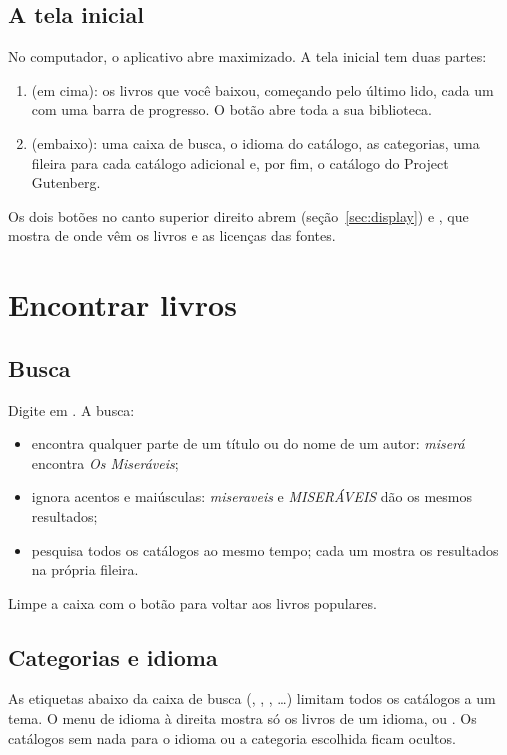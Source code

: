 \documentclass[11pt]{article}
\begin{document}
\subsection{A tela inicial}
No computador, o aplicativo abre maximizado. A tela inicial tem duas partes:

\begin{enumerate}
  \item {} (em cima): os livros que você baixou, começando pelo último lido, cada
        um com uma barra de progresso. O botão  abre toda a sua
        biblioteca.
  \item {} (embaixo): uma caixa de busca, o idioma do catálogo, as
        categorias, uma fileira para cada catálogo adicional e, por fim, o catálogo do Project
        Gutenberg.
\end{enumerate}


Os dois botões no canto superior direito abrem 
(seção~\ref{sec:display}) e , que mostra de onde vêm os livros e as licenças das fontes.

\section{Encontrar livros}

\subsection{Busca}
Digite em . A busca:
\begin{itemize}
  \item encontra qualquer parte de um título ou do nome de um autor: \emph{miserá} encontra
        \emph{Os Miseráveis};
  \item ignora acentos e maiúsculas: \emph{miseraveis} e \emph{MISERÁVEIS} dão os mesmos
        resultados;
  \item pesquisa todos os catálogos ao mesmo tempo; cada um mostra os resultados na própria
        fileira.
\end{itemize}
Limpe a caixa com o botão  para voltar aos livros populares.

\subsection{Categorias e idioma}
As etiquetas abaixo da caixa de busca (, , ,
…) limitam todos os catálogos a um tema. O menu de idioma à direita mostra só os livros
de um idioma, ou . Os catálogos sem nada para o idioma ou a categoria
escolhida ficam ocultos.
\end{document}
